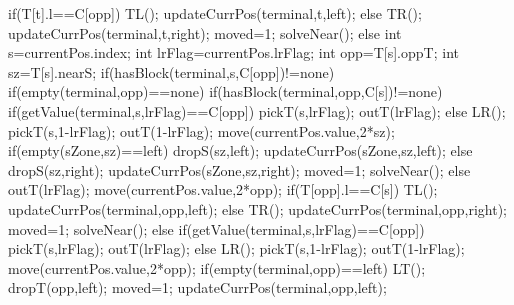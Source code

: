 {{{            if(T[t].l==C[opp])
            {
                TL();
                updateCurrPos(terminal,t,left);
            }
            else
            {
                TR();
                updateCurrPos(terminal,t,right);
            }
            moved=1;
        }
        solveNear();
    }
    else
    {
        int s=currentPos.index;
        int lrFlag=currentPos.lrFlag;
        int opp=T[s].oppT;
        int sz=T[s].nearS;
        if(hasBlock(terminal,s,C[opp])!=none)
        {
            if(empty(terminal,opp)==none)
            {
                if(hasBlock(terminal,opp,C[s])!=none)
                {
                    if(getValue(terminal,s,lrFlag)==C[opp])
                    {
                        pickT(s,lrFlag);
                        outT(lrFlag);
                    }
                    else
                    {
                        LR();
                        pickT(s,1-lrFlag);
                        outT(1-lrFlag);
                    }
                    move(currentPos.value,2*sz);
                    if(empty(sZone,sz)==left)
                    {
                        dropS(sz,left);
                        updateCurrPos(sZone,sz,left);
                    }
                    else
                    {
                        dropS(sz,right);
                        updateCurrPos(sZone,sz,right);
                    }
                    moved=1;
                    solveNear();
                }
                else
                {
                    outT(lrFlag);
                    move(currentPos.value,2*opp);
                    if(T[opp].l==C[s])
                    {
                        TL();
                        updateCurrPos(terminal,opp,left);
                    }
                    else
                    {
                        TR();
                        updateCurrPos(terminal,opp,right);
                    }
                    moved=1;
                    solveNear();
                }
            }
            else
            {
                if(getValue(terminal,s,lrFlag)==C[opp])
                {
                    pickT(s,lrFlag);
                    outT(lrFlag);
                }
                else
                {
                    LR();
                    pickT(s,1-lrFlag);
                    outT(1-lrFlag);
                }
                move(currentPos.value,2*opp);
                if(empty(terminal,opp)==left)
                {
                    LT();
                    dropT(opp,left);
                    moved=1;
                    updateCurrPos(terminal,opp,left);
}}}}}
